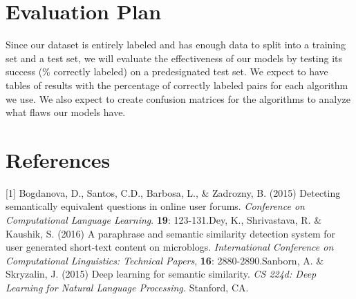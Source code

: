 \documentclass{article}
\begin{document}
\section{Evaluation Plan}
Since our dataset is entirely labeled and has enough data to split into a training set and a test set, we will evaluate the effectiveness of our models by testing its success (\% correctly labeled) on a predesignated test set. We expect to have tables of results with the percentage of correctly labeled pairs for each algorithm we use. We also expect to create confusion matrices for the algorithms to analyze what flaws our models have.

\section{References}
[1] Bogdanova, D., Santos, C.D., Barbosa, L., \& Zadrozny, B. (2015) Detecting semantically equivalent questions in online user forums. {\it Conference on Computational Language Learning}. {\bf 19}: 123-131.\newline
[2] Dey, K., Shrivastava, R. \& Kaushik, S. (2016) A paraphrase and semantic similarity detection system for user generated short-text content on microblogs. {\it International Conference on Computational Linguistics: Technical Papers}, {\bf 16}: 2880-2890.\newline
[3] Sanborn, A. \& Skryzalin, J. (2015) Deep learning for semantic similarity. {\it CS 224d: Deep Learning for Natural Language Processing.} Stanford, CA.
\end{document}
